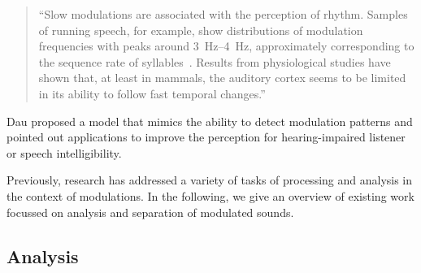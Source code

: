 \begin{quote}
``Slow modulations are associated with the perception of rhythm. Samples of running speech, for example, show distributions of modulation frequencies with peaks around \SIrange{3}{4}{\hertz}, approximately corresponding to the sequence rate of syllables~\cite{plomp83}. Results from physiological studies have shown that, at least in mammals, the auditory cortex seems to be limited in its ability to follow fast temporal changes.''
\end{quote}

Dau proposed a model that mimics the ability to detect modulation patterns and pointed out applications to improve the perception for hearing-impaired listener or speech intelligibility.
\par
Previously, research has addressed a variety of tasks of processing and analysis in the context of modulations.
In the following, we give an overview of existing work focussed on analysis and separation of modulated sounds.

\subsection{Analysis}\label{sub:modulation-analysis}

